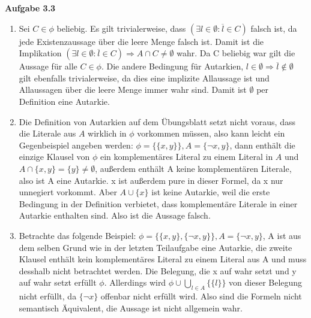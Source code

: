 \documentclass[a4paper,10pt]{article}
\begin{document}
\noindent\textbf{Aufgabe 3.3}\\\smallskip
\begin{enumerate}
\item Sei $C \in \phi$ beliebig. Es gilt trivialerweise, dass $(\exists l \in \emptyset: \overline{l} \in C)$ falsch ist, da jede Existenzaussage über die leere Menge falsch ist. Damit ist die Implikation $(\exists l \in \emptyset: \overline{l} \in C) \Rightarrow A \cap C \neq \emptyset$ wahr. Da C beliebig war gilt die Aussage für alle $C \in \phi$. Die andere Bedingung für Autarkien, $l \in \emptyset \Rightarrow \overline{l} \notin \emptyset$ gilt ebenfalls trivialerweise, da dies eine implizite Allaussage ist und Allaussagen über die leere Menge immer wahr sind. Damit ist $\emptyset$ per Definition eine Autarkie.

\item Die Definition von Autarkien auf dem Übungsblatt setzt nicht voraus, dass die Literale aus $A$ wirklich in $\phi$ vorkommen müssen, also kann leicht ein Gegenbeispiel angeben werden: $\phi = \{\{x, y\}\}, A = \{\neg x, y\}$, dann enthält die einzige Klausel von $\phi$ ein komplementäres Literal zu einem Literal in $A$ und $A \cap \{x, y\} = \{y\} \neq \emptyset$, außerdem enthält A keine komplementären Literale, also ist A eine Autarkie. x ist außerdem pure in dieser Formel, da x nur unnegiert vorkommt. Aber $A \cup \{x\}$ ist keine Autarkie, weil die erste Bedingung in der Definition verbietet, dass komplementäre Literale in einer Autarkie enthalten sind. Also ist die Aussage falsch.

\item Betrachte das folgende Beispiel: $\phi = \{\{x, y\}, \{\neg x, y\}\}, A = \{\neg x, y\}$, A ist aus dem selben Grund wie in der letzten Teilaufgabe eine Autarkie, die zweite Klausel enthält kein komplementäres Literal zu einem Literal aus A und muss desshalb nicht betrachtet werden. Die Belegung, die x auf wahr setzt und y auf wahr setzt erfüllt $\phi$. Allerdings wird $\phi \cup \bigcup_{l \in A}\{\{l\}\}$ von dieser Belegung nicht erfüllt, da $\{\neg x\}$ offenbar nicht erfüllt wird. Also sind die Formeln nicht semantisch Äquivalent, die Aussage ist nicht allgemein wahr. 


\end{enumerate}
\end{document}
